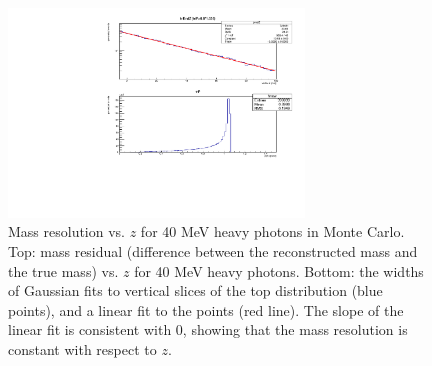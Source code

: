 


\begin{figure}[ht]
\begin{center}
    \includegraphics[width=0.7\textwidth,page=5,angle=-90]{vertexing/figs/acceptance_30}
\end{center}
    \caption{Mass resolution vs. $z$ for 40 MeV heavy photons in Monte Carlo.
    Top: mass residual (difference between the reconstructed mass and the true mass) vs. $z$ for 40 MeV heavy photons.
    Bottom: the widths of Gaussian fits to vertical slices of the top distribution (blue points), and a linear fit to the points (red line).
    The slope of the linear fit is consistent with 0, showing that the mass resolution is constant with respect to $z$.}
    \label{fig:fixed_mres}
\end{figure}

